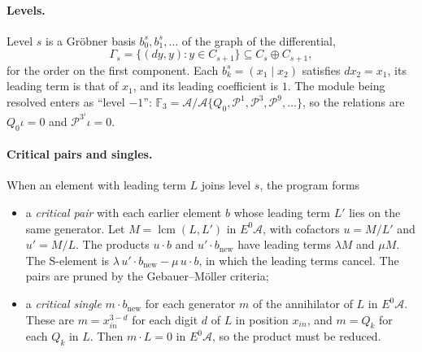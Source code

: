 \documentclass[11pt]{article}
\renewcommand{\P}{\mathcal{P}}
\newcommand{\F}{\mathbb{F}_3}
\newcommand{\A}{\mathcal{A}}
\begin{document}
\paragraph{Levels.}
Level $s$ is a Gröbner basis $b^s_0, b^s_1, \dots$ of the graph of the differential,
\[ \Gamma_s = \{ (d y, y) : y \in C_{s+1} \} \subseteq C_s \oplus C_{s+1}, \]
for the order on the first component. Each $b^s_k = (x_1 \mid x_2)$ satisfies $d x_2 = x_1$, its
leading term is that of $x_1$, and its leading coefficient is $1$. The module being resolved
enters as ``level $-1$'': $\F = \A/\A\{Q_0, \P^1, \P^3, \P^9, \dots\}$, so the relations are
$Q_0\iota = 0$ and $\P^{3^i}\iota = 0$.

\paragraph{Critical pairs and singles.}
When an element with leading term $L$ joins level $s$, the program forms
\begin{itemize}
\item a \emph{critical pair} with each earlier element $b$ whose leading term $L'$ lies on the
  same generator. Let $M = \operatorname{lcm}(L, L')$ in $E^0\A$, with cofactors $u = M/L'$ and
  $u' = M/L$. The products $u\cdot b$ and $u'\cdot b_{\text{new}}$ have leading terms
  $\lambda M$ and $\mu M$. The S-element is $\lambda\, u'\cdot b_{\text{new}} - \mu\, u\cdot b$,
  in which the leading terms cancel. The pairs are pruned by the Gebauer--Möller criteria;
\item a \emph{critical single} $m \cdot b_{\text{new}}$ for each generator $m$ of the
  annihilator of $L$ in $E^0\A$. These are $m = x_{in}^{3-d}$ for each digit $d$ of $L$ in
  position $x_{in}$, and $m = Q_k$ for each $Q_k$ in $L$. Then $m \cdot L = 0$ in $E^0\A$, so
  the product must be reduced.
\end{itemize}
\end{document}
